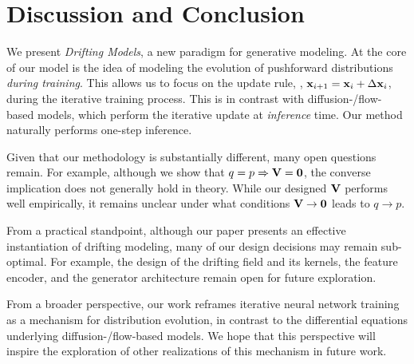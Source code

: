 \section{Discussion and Conclusion}

We present \emph{Drifting Models}, a new paradigm for generative modeling. 
At the core of our model is the idea of modeling the evolution of pushforward distributions \textit{during training}.
This allows us to focus on the update rule, \ie, $\mathbf{x}_{i+1} = \mathbf{x}_{i} + \Delta \mathbf{x}_i$, during the iterative training process.
This is in contrast with diffusion-/flow-based models, which perform the iterative update at \textit{inference} time. Our method naturally performs one-step inference.

Given that our methodology is substantially different, many open questions remain.
For example, although we show that $q=p \Rightarrow \mathbf{V}=\mathbf{0}$, the converse implication does not generally hold in theory.
While our designed $\mathbf{V}$ performs well empirically, it remains unclear under what conditions $\mathbf{V}\rightarrow\mathbf{0}$ leads to $q\rightarrow p$.

From a practical standpoint, although our paper presents an effective instantiation of drifting modeling, many of our design decisions may remain sub-optimal. For example, the design of the drifting field and its kernels, the feature encoder, and the generator architecture remain open for future exploration.

From a broader perspective, our work reframes iterative neural network training as a mechanism for distribution evolution, in contrast to the differential equations underlying diffusion-/flow-based models.
We hope that this perspective will inspire the exploration of other realizations of this mechanism in future work.

\vfill